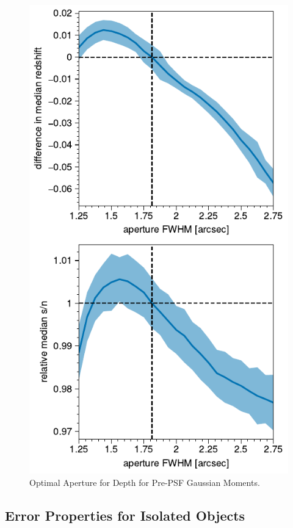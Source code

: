 \documentclass[twocolappendix, appendixfloats, numberedappendix, twocolumn, apj]{openjournal}
\begin{document}
\begin{figure}
  \centering
  \vspace{1em}
  \includegraphics[width=\columnwidth]{figures/optap_depth.pdf}
  \caption{
    Optimal Aperture for Depth for Pre-PSF Gaussian Moments.
    \label{fig:opap_depth}
  }
\end{figure}


\subsection{Error Properties for Isolated Objects}
\end{document}
